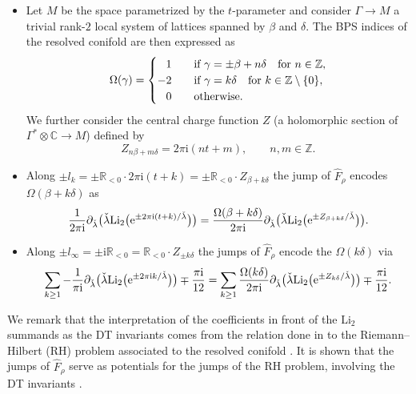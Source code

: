 \documentclass[pdftex]{sigma}
\numberwithin{equation}{section}
\begin{document}
\begin{itemize}
 \item Let $M$ be the space parametrized by the $t$-parameter and consider $\Gamma\to M$ a trivial rank-$2$ local system of lattices spanned by $\beta$ and $\delta$. The BPS indices of the resolved conifold are then expressed as
 \begin{equation*}
 \Omega(\gamma) =
 \begin{cases}
 \hphantom{-}1 & \quad \text{if } \gamma = \pm \beta + n \delta\quad \text{for } n\in \mathbb{Z},\\
 -2 & \quad \text{if } \gamma= k \delta \quad \text{for } k\in \mathbb{Z}\setminus \{ 0\},\\
 \hphantom{-}0 & \quad \text{otherwise}.
 \end{cases}
 \end{equation*}
 We further consider the central charge function $Z$ (a holomorphic section of ${\Gamma^*\otimes \mathbb{C} \to M}$) defined by
 \begin{equation*}
 Z_{n\beta+m\delta}=2\pi \mathrm{i}(nt+m), \qquad n,m \in \mathbb{Z}.
 \end{equation*}
 \item Along $\pm l_k= \pm \mathbb{R}_{<0}\cdot 2\pi \mathrm{i}(t+k)=\pm \mathbb{R}_{<0}\cdot Z_{\beta +k\delta}$ the jump of $\hat{F}_{\rho}$ encodes $\Omega(\beta+k\delta)$ as
 \begin{equation}\label{jumpsDT1}
 \frac{1}{2\pi \mathrm{i}}\partial_{\check{\lambda}}\big(\check{\lambda}\mathrm{Li}_2\big({\rm e}^{\pm 2\pi \mathrm{i}(t+k)/\check{\lambda}}\big)\big)=\frac{\Omega(\beta+k\delta)}{2\pi \mathrm{i}}\partial_{\check{\lambda}}\big(\check{\lambda}\mathrm{Li}_2\big({\rm e}^{\pm Z_{\beta+k\delta}/\check{\lambda}}\big)\big).
 \end{equation}
 \item Along $\pm l_{\infty}=\pm \mathrm{i}\mathbb{R}_{<0}= \mathbb{R}_{<0}\cdot Z_{\pm k\delta}$ the jumps of $\hat{F}_{\rho}$ encode the $\Omega(k\delta)$ via
 \begin{equation}\label{jumpsDT2}
 \sum_{k\geq 1}-\frac{1}{\pi \mathrm{i}}\partial_{\check{\lambda}}\big(\check{\lambda}\mathrm{Li}_2\big({\rm e}^{\pm 2\pi \mathrm{i} k/\check{\lambda}}\big)\big)\mp \frac{\pi \mathrm{i}}{12}=\sum_{k\geq 1}\frac{\Omega(k\delta)}{2\pi \mathrm{i}}\partial_{\check{\lambda}}\big(\check{\lambda}\mathrm{Li}_2\big({\rm e}^{\pm Z_{k\delta}/\check{\lambda}}\big)\big)\mp \frac{\pi \mathrm{i}}{12}.
 \end{equation}
\end{itemize}
We remark that the interpretation of the coefficients in front of the $\mathrm{Li}_2$ summands as the DT invariants comes from the relation done in \cite[Section~4.2]{ASTT21} to the Riemann--Hilbert (RH) problem associated to the resolved conifold \cite{BridgelandCon}. It is shown that the jumps of $\hat{F}_{\rho}$ serve as potentials for the jumps of the RH problem, involving the DT invariants \cite[Corollary~4.13]{ASTT21}.
\end{document}

